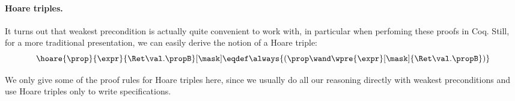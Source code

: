 \paragraph{Hoare triples.}
It turns out that weakest precondition is actually quite convenient to work with, in particular when perfoming these proofs in Coq.
Still, for a more traditional presentation, we can easily derive the notion of a Hoare triple:
\[
\hoare{\prop}{\expr}{\Ret\val.\propB}[\mask] \eqdef \always{(\prop \wand \wpre{\expr}[\mask]{\Ret\val.\propB})}
\]

We only give some of the proof rules for Hoare triples here, since we usually do all our reasoning directly with weakest preconditions and use Hoare triples only to write specifications.
